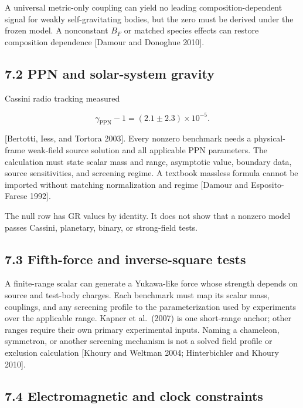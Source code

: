 \documentclass[
  american,
  11pt,
  letterpaper,
]{article}
\begin{document}
A universal metric-only coupling can yield no leading composition-dependent signal for weakly self-gravitating bodies, but the zero must be derived under the frozen model. A nonconstant \(B_F\) or matched species effects can restore composition dependence {[}Damour and Donoghue 2010{]}.

\subsection{7.2 PPN and solar-system gravity}\label{ppn-and-solar-system-gravity}

Cassini radio tracking measured

\begin{equation}
\gamma_{\mathrm{PPN}}-1=(2.1\pm2.3)\times10^{-5}.
\tag{25}
\end{equation}

{[}Bertotti, Iess, and Tortora 2003{]}. Every nonzero benchmark needs a physical- frame weak-field source solution and all applicable PPN parameters. The calculation must state scalar mass and range, asymptotic value, boundary data, source sensitivities, and screening regime. A textbook massless formula cannot be imported without matching normalization and regime {[}Damour and Esposito-Farese 1992{]}.

The null row has GR values by identity. It does not show that a nonzero model passes Cassini, planetary, binary, or strong-field tests.

\subsection{7.3 Fifth-force and inverse-square tests}\label{fifth-force-and-inverse-square-tests}

A finite-range scalar can generate a Yukawa-like force whose strength depends on source and test-body charges. Each benchmark must map its scalar mass, couplings, and any screening profile to the parameterization used by experiments over the applicable range. Kapner et al.~(2007) is one short-range anchor; other ranges require their own primary experimental inputs. Naming a chameleon, symmetron, or another screening mechanism is not a solved field profile or exclusion calculation {[}Khoury and Weltman 2004; Hinterbichler and Khoury 2010{]}.

\subsection{7.4 Electromagnetic and clock constraints}\label{electromagnetic-and-clock-constraints}
\end{document}
